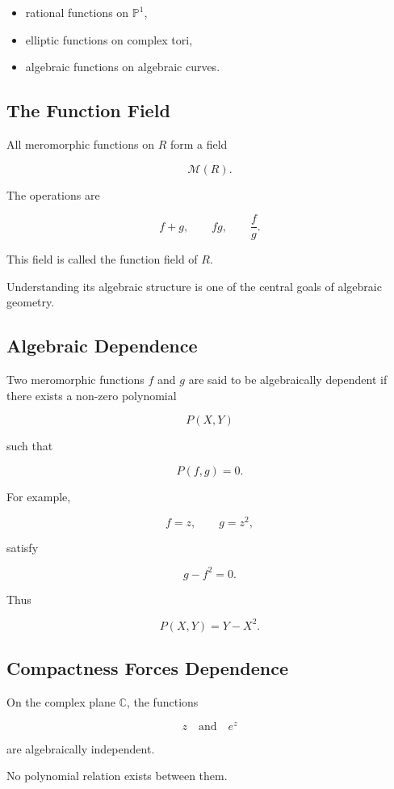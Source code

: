 \documentclass[12pt,a4paper]{article}
\theoremstyle{notespace}
\begin{document}
\begin{itemize}
	\item rational functions on \(\mathbb P^1\),
	\item elliptic functions on complex tori,
	\item algebraic functions on algebraic curves.
\end{itemize}

\subsection{The Function Field}

All meromorphic functions on \(R\) form a field

\[
\mathcal M(R).
\]

The operations are

\[
f+g,
\qquad
fg,
\qquad
\frac fg.
\]

This field is called the function field of \(R\).

Understanding its algebraic structure is one of the central goals of algebraic geometry.

\subsection{Algebraic Dependence}

Two meromorphic functions \(f\) and \(g\) are said to be algebraically dependent if there exists a non-zero polynomial

\[
P(X,Y)
\]

such that

\[
P(f,g)=0.
\]

For example,

\[
f=z,
\qquad
g=z^2,
\]

satisfy

\[
g-f^2=0.
\]

Thus

\[
P(X,Y)=Y-X^2.
\]

\subsection{Compactness Forces Dependence}

On the complex plane \(\mathbb C\), the functions

\[
z
\quad\text{and}\quad
e^z
\]

are algebraically independent.

No polynomial relation exists between them.
\end{document}

